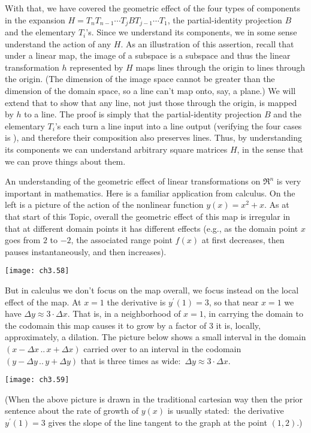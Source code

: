 With that, we have covered the geometric effect of the four types 
of components in the expansion
$H=T_nT_{n-1}\cdots T_jBT_{j-1}\cdots T_1$,
the partial-identity projection $B$ and the elementary $T_i$'s.
Since we understand its components, we in some sense 
understand the action of any $H$.
As an illustration of this assertion, 
recall that under a linear map, the image of a subspace is a subspace
and thus the linear transformation $h$ represented by $H$ maps lines 
through the origin to lines through the origin.
(The dimension of the image space cannot be greater than 
the dimension of the domain space, so a line can't map onto, say, a plane.)
We will extend that to show that any line, 
not just those through the origin, 
is mapped by $h$ to a line.
The proof is simply
that the partial-identity projection $B$ and the elementary $T_i$'s
each turn a line input into a line output 
(verifying the four cases is ),
and therefore their composition also preserves lines.
Thus, by understanding its components we can understand arbitrary square 
matrices $H$, in the sense that we can prove things about them.

An understanding of the geometric effect of linear transformations 
on $\Re^n$ is very important in mathematics. 
Here is a familiar application from calculus.
On the left is a picture
of the action of the nonlinear function \( y(x)=x^2+x \).
As at that start of this Topic, overall the geometric effect of this map is
irregular in that at different domain points it has different effects
(e.g., as the domain point $x$ goes from $2$ to $-2$, the associated range
point $f(x)$ at first decreases, then pauses instantaneously,
and then increases).
\begin{center}
  \texttt{[image: ch3.58]}
\end{center}
But in calculus we don't focus on the map overall, 
we focus instead on the local effect of the map.
At $x=1$ the derivative is \( y^\prime(1)=3 \),
so that near \( x=1 \) 
we have \( \Delta y\approx 3\cdot\Delta x \).
That is, in a neighborhood of $x=1$,
in carrying the domain to the codomain this map causes it to grow by
a factor of $3$ \Dash  it is, locally, 
approximately, a dilation.
The picture below shows a small interval 
in the domain $(x-\Delta x\,..\,x+\Delta x)$
carried over to an interval in the codomain $(y-\Delta y\,..\,y+\Delta y)$
that is three times as wide:~$\Delta y \approx 3\cdot \Delta x$.
\begin{center}
  \texttt{[image: ch3.59]}
\end{center}
(When the above picture is drawn in the traditional cartesian way
then the prior sentence about the rate of growth of $y(x)$ is usually
stated:~the derivative $y^\prime(1)=3$ gives the slope of the 
line tangent to the graph at the point $(1,2)$.)


